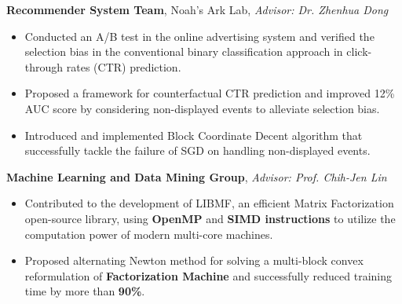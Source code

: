 \documentclass[11pt,a4paper]{moderncv}
\begin{document}
{\textbf{Recommender System Team}, Noah's Ark Lab, \emph{Advisor: Dr. Zhenhua Dong}
\begin{itemize}%
    \item Conducted an A/B test in the online advertising system and verified the selection bias in the conventional binary classification approach in click-through rates (CTR) prediction.
    \item Proposed a framework for counterfactual CTR prediction and improved 12\% AUC score by considering non-displayed events to alleviate selection bias. %
    \item Introduced and implemented Block Coordinate Decent algorithm that successfully tackle the failure of SGD on handling non-displayed events.
\end{itemize}
}



{\textbf{Machine Learning and Data Mining Group}, \emph{Advisor: Prof. Chih-Jen Lin}
\begin{itemize}%
\item Contributed to the development of LIBMF, an efficient Matrix Factorization open-source library,
    using \textbf{OpenMP} and \textbf{SIMD instructions} to utilize the computation power of modern multi-core machines.
\item Proposed alternating Newton method for solving a multi-block convex reformulation of \textbf{Factorization Machine} and successfully reduced training time by more than \textbf{90\%}.
\end{itemize}
}
\end{document}
